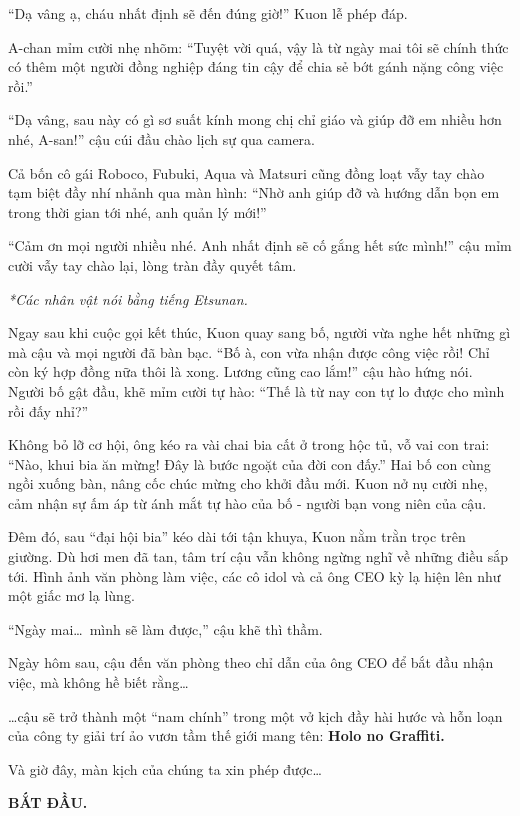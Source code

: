\documentclass[../main.tex]{subfiles}
\begin{document}
``Dạ vâng ạ, cháu nhất định sẽ đến đúng giờ!'' Kuon lễ phép đáp.

A-chan mỉm cười nhẹ nhõm: ``Tuyệt vời quá, vậy là từ ngày mai tôi sẽ chính thức có thêm một người đồng nghiệp đáng tin cậy để chia sẻ bớt gánh nặng công việc rồi.''

``Dạ vâng, sau này có gì sơ suất kính mong chị chỉ giáo và giúp đỡ em nhiều hơn nhé, A-san!'' cậu cúi đầu chào lịch sự qua camera.

Cả bốn cô gái Roboco, Fubuki, Aqua và Matsuri cũng đồng loạt vẫy tay chào tạm biệt đầy nhí nhảnh qua màn hình: ``Nhờ anh giúp đỡ và hướng dẫn bọn em trong thời gian tới nhé, anh quản lý mới!''

``Cảm ơn mọi người nhiều nhé. Anh nhất định sẽ cố gắng hết sức mình!'' cậu mỉm cười vẫy tay chào lại, lòng tràn đầy quyết tâm.

\begin{center}
  {\textit{*Các nhân vật nói bằng tiếng Etsunan.}}
\end{center}

Ngay sau khi cuộc gọi kết thúc, Kuon quay sang bố, người vừa nghe hết những gì mà cậu và mọi người đã bàn bạc. ``Bố à, con vừa nhận được công việc rồi! Chỉ còn ký hợp đồng nữa thôi là xong. Lương cũng cao lắm!'' cậu hào hứng nói. Người bố gật đầu, khẽ mỉm cười tự hào: ``Thế là từ nay con tự lo được cho mình rồi đấy nhỉ?''

Không bỏ lỡ cơ hội, ông kéo ra vài chai bia cất ở trong hộc tủ, vỗ vai con trai: ``Nào, khui bia ăn mừng! Đây là bước ngoặt của đời con đấy.'' Hai bố con cùng ngồi xuống bàn, nâng cốc chúc mừng cho khởi đầu mới. Kuon nở nụ cười nhẹ, cảm nhận sự ấm áp từ ánh mắt tự hào của bố - người bạn vong niên của cậu.

Đêm đó, sau ``đại hội bia'' kéo dài tới tận khuya, Kuon nằm trằn trọc trên giường. Dù hơi men đã tan, tâm trí cậu vẫn không ngừng nghĩ về những điều sắp tới. Hình ảnh văn phòng làm việc, các cô idol và cả ông CEO kỳ lạ hiện lên như một giấc mơ lạ lùng.

``Ngày mai\dots\ mình sẽ làm được,'' cậu khẽ thì thầm.

Ngày hôm sau, cậu đến văn phòng theo chỉ dẫn của ông CEO để bắt đầu nhận việc, mà không hề biết rằng\dots

\dots cậu sẽ trở thành một ``nam chính'' trong một vở kịch đầy hài hước và hỗn loạn của công ty giải trí ảo vươn tầm thế giới mang tên: \textbf{Holo no Graffiti.}

Và giờ đây, màn kịch của chúng ta xin phép được\dots

\begin{center}
  \textbf{\huge BẮT ĐẦU.}
\end{center}
\end{document}
